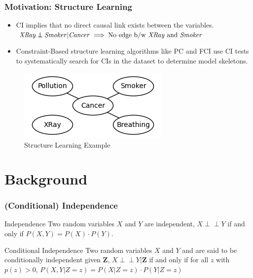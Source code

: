 \documentclass{beamer}
\def\ci{\perp\!\!\!\!\!\perp}
\begin{document}
\begin{frame}
	\frametitle{Motivation: Structure Learning}
	\begin{itemize}
		\setlength\itemsep{1em}
		\item CI implies that no direct causal link exists between the variables. \newline
			$ \text{\emph{XRay}} \ci \text{\emph{Smoker}} | \text{\emph{Cancer}} \implies \text{No edge b/w \emph{XRay} and \emph{Smoker}} $

		\item Constraint-Based structure learning algorithms like PC
			and FCI use CI tests to systematically search for CIs
			in the dataset to determine model skeletons.
	\end{itemize}
	\begin{figure}
		\centering
		\includegraphics[scale=0.6]{imgs/example_sl.png}
		\caption*{Structure Learning Example}
	\end{figure}
\end{frame}

\section{Background}
\begin{frame}
	\frametitle{(Conditional) Independence}
	\begin{block}{Independence}
		Two random variables $ X $ and $ Y $ are independent,
		$ X \ci Y $ if and only if $ P(X, Y) = P(X) \cdot P(Y) $.
	\end{block}
	\vspace{1em}

	\begin{block}{Conditional Independence}
		Two random variables $ X $ and $ Y $ and are said to be
		conditionally independent given $ \bm{Z} $, $ X \ci Y | \bm{Z}
		$ if and only if for all $ z $ with $ p(z) > 0 $, $ P(X, Y |
		Z=z) = P(X | Z=z) \cdot P(Y | Z=z) $
	\end{block}
\end{frame}
\end{document}
